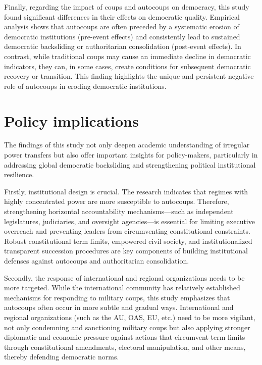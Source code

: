 \documentclass[
  12pt,
]{report}
\begin{document}
Finally, regarding the impact of coups and autocoups on democracy, this
study found significant differences in their effects on democratic
quality. Empirical analysis shows that autocoups are often preceded by a
systematic erosion of democratic institutions (pre-event effects) and
consistently lead to sustained democratic backsliding or authoritarian
consolidation (post-event effects). In contrast, while traditional coups
may cause an immediate decline in democratic indicators, they can, in
some cases, create conditions for subsequent democratic recovery or
transition. This finding highlights the unique and persistent negative
role of autocoups in eroding democratic institutions.

\section{Policy implications}\label{policy-implications-1}

The findings of this study not only deepen academic understanding of
irregular power transfers but also offer important insights for
policy-makers, particularly in addressing global democratic backsliding
and strengthening political institutional resilience.

Firstly, institutional design is crucial. The research indicates that
regimes with highly concentrated power are more susceptible to
autocoups. Therefore, strengthening horizontal accountability
mechanisms---such as independent legislatures, judiciaries, and
oversight agencies---is essential for limiting executive overreach and
preventing leaders from circumventing constitutional constraints. Robust
constitutional term limits, empowered civil society, and
institutionalized transparent succession procedures are key components
of building institutional defenses against autocoups and authoritarian
consolidation.

Secondly, the response of international and regional organizations needs
to be more targeted. While the international community has relatively
established mechanisms for responding to military coups, this study
emphasizes that autocoups often occur in more subtle and gradual ways.
International and regional organizations (such as the AU, OAS, EU, etc.)
need to be more vigilant, not only condemning and sanctioning military
coups but also applying stronger diplomatic and economic pressure
against actions that circumvent term limits through constitutional
amendments, electoral manipulation, and other means, thereby defending
democratic norms.
\end{document}
